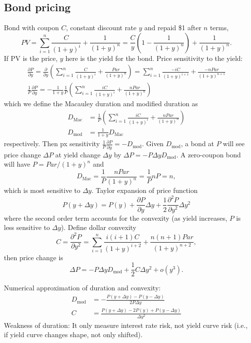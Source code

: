 \documentclass[9pt,twocolumn]{extarticle}
\begin{document}
\subsection*{Bond pricing}
Bond with coupon $C$, constant discount rate $y$ and repaid \$1 after $n$ terms,
$$ PV = \sum_{i=1}^n \frac{C}{(1+y)^i} + \frac{1}{(1+y)^n}
      = \frac{C}{y} \left(1-\frac{1}{(1+y)^n}\right) + \frac{1}{(1+y)^n}.
$$
If PV is the price, $y$ here is the yield for the bond. Price sensitivity to the yield:
\begin{gather*}
\frac{\partial P}{\partial y}
= \frac{\partial}{\partial y} \left(\sum_{i=1}^n \frac{C}{(1+y)^i} + \frac{Par}{(1+y)^n}\right)
= \sum_{i=1}^n \frac{-iC}{(1+y)^{i+1}} + \frac{-nPar}{(1+y)^{n+1}} \\
\frac{1}{P}\frac{\partial P}{\partial y}
= -\frac{1}{1+y}\frac{1}{P}\left( \sum_{i=1}^n \frac{iC}{(1+y)^i} + \frac{nPar}{(1+y)^n} \right)
\end{gather*}
which we define the Macauley duration and modified duration as
\begin{align*}
D_{\textrm{Mac}} &= \frac{1}{P}\left( \sum_{i=1}^n \frac{iC}{(1+y)^i} + \frac{nPar}{(1+y)^n} \right) \\
D_{\textrm{mod}} &= \frac{1}{1+y}D_{\textrm{Mac}}
\end{align*}
respectively. Then px sensitivity $\frac{1}{P}\frac{\partial P}{\partial y} = -D_{\textrm{mod}}$.
Given $D_{\textrm{mod}}$, a bond at $P$ will see price change $\Delta P$ at yield change $\Delta y$
by $\Delta P = -P\Delta y D_{\textrm{mod}}$. A zero-coupon bond will have $P = Par/(1+y)^n$ and
$$ D_{\textrm{Mac}} = \frac{1}{P}\frac{nPar}{(1+y)^n} = \frac{1}{P} nP = n, $$
which is most sensitive to $\Delta y$.
Taylor expansion of price function
$$ P(y+\Delta y) = P(y)
				 + \frac{\partial P}{\partial y}\Delta y
				 + \frac{1}{2}\frac{\partial^2 P}{\partial y^2}\Delta y^2
$$
where the second order term accounts for the convexity (as yield increases, $P$
is less sensitive to $\Delta y$). Define dollar convexity
$$ C = \frac{\partial^2 P}{\partial y^2}
     = \sum_{i=1}^n \frac{i(i+1)C}{(1+y)^{i+2}} + \frac{n(n+1)Par}{(1+y)^{n+2}}, $$
then price change is
$$ \Delta P = -P\Delta y D_{\textrm{mod}} + \frac{1}{2}C\Delta y^2 + o(y^3). $$

Numerical approximation of duration and convexity:
\begin{align*}
D_{\textrm{mod}} &= - \frac{P(y+\Delta y) - P(y - \Delta y)}{2P\Delta y} \\
C &= \frac{P(y+\Delta y) - 2P(y) + P(y-\Delta y)}{\Delta y^2}
\end{align*}
Weakness of duration: It only measure interest rate risk, not yield curve risk
(i.e., if yield curve changes shape, not only shifted).
\end{document}
